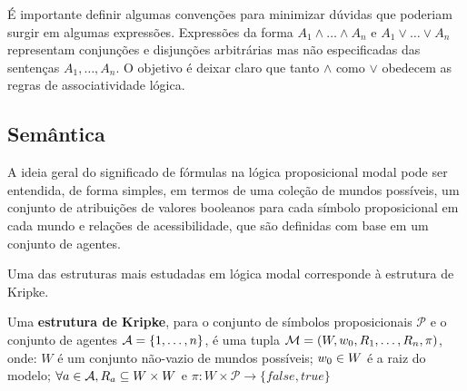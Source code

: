 É importante definir algumas convenções para minimizar 
dúvidas que poderiam surgir em algumas expressões.
Expressões da forma $A_1 \wedge \ldots \wedge A_n$ e $A_1 \vee \ldots \vee A_n$
representam conjunções e disjunções arbitrárias mas não especificadas das
sentenças $A_1,\ldots,A_n$. O objetivo é deixar claro que tanto $\wedge$ como
$\vee$ obedecem as regras de associatividade lógica. 

\subsection{Semântica}
\label{semantics}

A ideia geral do significado de fórmulas na lógica proposicional modal pode ser
entendida, de forma simples, em termos de uma coleção de mundos possíveis, um conjunto
de atribuições de valores booleanos para cada símbolo proposicional em cada
mundo e relações de acessibilidade, que são definidas com base em um conjunto de
agentes.

Uma das estruturas mais estudadas em lógica modal corresponde à estrutura de
Kripke. 

\begin{definition}
    Uma \textbf{estrutura de Kripke}, para o conjunto de símbolos proposicionais
    $\mathcal{P}$ e o conjunto de agentes ${\cal{A}} = \{1,\ldots, n\}$, é
    uma tupla $\mathcal{M} = (W, w_0, R_1,\ldots, R_n, \pi)$, onde:
   $W$ é um conjunto não-vazio de mundos possíveis; $w_0 \in W$ é a raiz do modelo; 
   $\forall a \in {\cal{A}}, R_{a} \subseteq W \times W$ e
   $\pi : W \times \mathcal{P} \longrightarrow \{false, true\}$
    
\end{definition}

